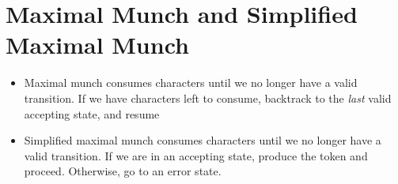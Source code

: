 \documentclass[12pt]{article}
\begin{document}
\section{Maximal Munch and Simplified Maximal Munch}
\begin{itemize}
    \item Maximal munch consumes characters until we no longer have a valid transition.  If we have characters left to consume, backtrack to the \emph{last} valid accepting state, and resume
    \item Simplified maximal munch consumes characters until we no longer have a valid transition.  If we are in an accepting state, produce the token and proceed.  Otherwise, go to an error state.
\end{itemize}
\end{document}
